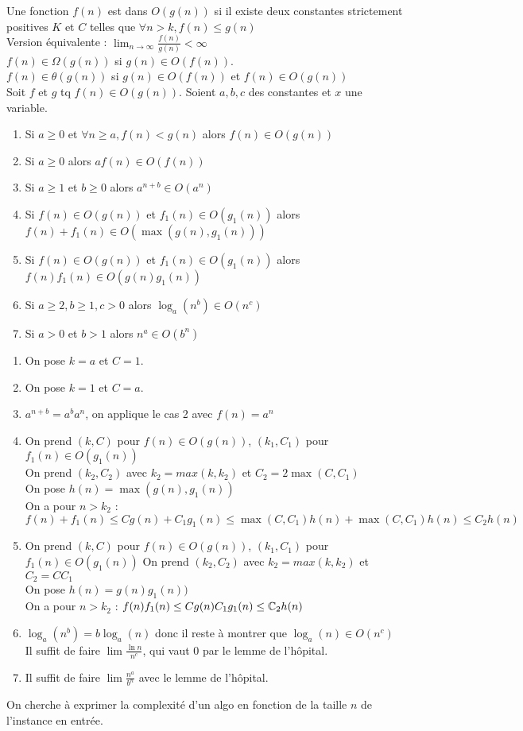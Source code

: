  Une fonction $f(n)$ est dans $O(g(n))$ si il existe deux constantes strictement positives $K$ et $C$ telles que 
$\forall n > k, f(n) \leq g(n)$ \\
Version équivalente : $\displaystyle{\lim_{n\rightarrow \infty} \frac{f(n)}{g(n)} < \infty}$\\

\titre{$\Omega$ :} $f(n) \in \Omega(g(n))$ si $g(n) \in O(f(n))$. \\

\titre{$\theta$ :} $f(n) \in \theta(g(n))$ si $g(n) \in O(f(n))$ et $f(n) \in O(g(n))$ \\

 Soit $f$ et $g$ tq $f(n) \in O(g(n))$. Soient $a,b,c$ des constantes et $x$ une variable.
\begin{enumerate}
	\item Si $a\geq0$ et $\forall n \geq a, f(n) < g(n)$ alors $f(n) \in O(g(n))$
	\item Si $a\geq0$ alors $af(n) \in O(f(n))$
	\item Si $a\geq1$ et $b\geq0$ alors $a^{n+b}\in O(a^n)$
	\item Si $f(n)\in O(g(n))$ et $f_1(n) \in O(g_1(n))$ alors $f(n) + f_1(n) \in O(\max(g(n),g_1(n)))$
	\item Si $f(n) \in O(g(n))$ et $f_1(n) \in O(g_1(n))$ alors $f(n)f_1(n) \in O(g(n)g_1(n))$
	\item Si $a \geq 2, b \geq 1, c > 0$ alors $\log_a(n^b) \in O(n^c)$
	\item Si $a > 0$ et $b > 1$ alors $n^a\in O(b^n)$
\end{enumerate}
\newpage
{}
\begin{enumerate}
	\item On pose $k=a$ et $C=1$.
	\item On pose $k=1$ et $C=a$.
	\item $a^{n+b}=a^ba^n$, on applique le cas 2 avec $f(n) = a^n$
	\item On prend $(k,C)$ pour $f(n) \in O(g(n))$, $(k_1,C_1)$ pour $f_1(n) \in O(g_1(n))$ \\
			On prend $(k_2,C_2)$ avec $k_2=max(k,k_2)$ et $C_2=2\max(C,C_1)$\\ On pose $h(n) = \max(g(n),g_1(n))$ \\
			On a pour $n>k_2$ : $f(n) + f_1(n) \leq Cg(n) + C_1g_1(n) \leq \max(C,C_1)h(n) + \max(C,C_1)h(n) \leq C_2h(n)$ 
	\item On prend $(k,C)$ pour $f(n) \in O(g(n))$, $(k_1,C_1)$ pour $f_1(n) \in O(g_1(n))$ 
			On prend $(k_2,C_2)$ avec $k_2=max(k,k_2)$ et $C_2=CC_1$\\ On pose $h(n) = g(n)g_1(n))$ \\
			On a pour $n>k_2$ : $f(n)f_1(n) \leq Cg(n)C_1g_1(n) \leq \mathbb{C}_2h(n)$ 
	\item $\log_a(n^b) = b\log_a(n)$ donc il reste à montrer que $\log_a(n) \in O(n^c)$ \\
		Il suffit de faire $\lim \frac{\ln n}{n^c}$, qui vaut 0 par le lemme de l'hôpital.
	\item Il suffit de faire $\lim \frac{n^a}{b^n}$ avec le lemme de l'hôpital.
\end{enumerate}

 On cherche à exprimer la complexité d'un algo en fonction de la taille $n$ de l'instance en entrée. \\



